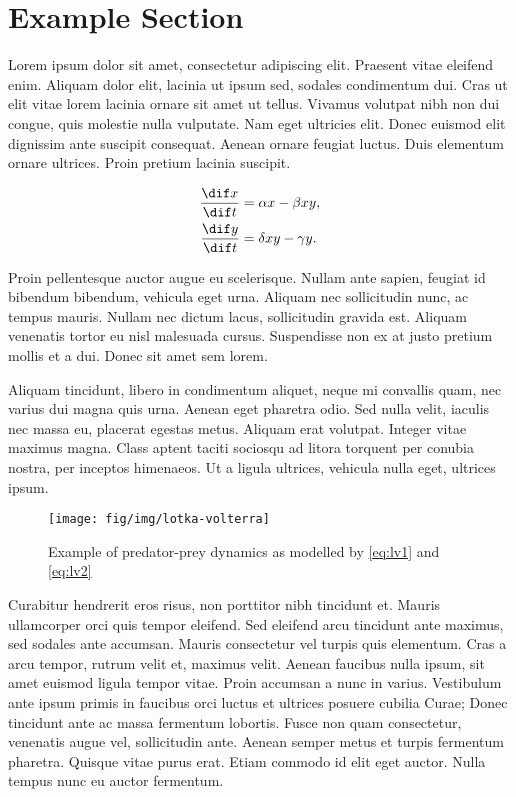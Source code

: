 \section{Example Section}
\label{sec:lvdiffeq}

Lorem ipsum dolor sit amet, consectetur adipiscing elit.
Praesent vitae eleifend enim.
Aliquam dolor elit, lacinia ut ipsum sed, sodales condimentum dui.
Cras ut elit vitae lorem lacinia ornare sit amet ut tellus.
Vivamus volutpat nibh non dui congue, quis molestie nulla vulputate.
Nam eget ultricies elit.
Donec euismod elit dignissim ante suscipit consequat.
Aenean ornare feugiat luctus.
Duis elementum ornare ultrices.
Proin pretium lacinia suscipit.

\begin{align}
  \frac{\dif x}{\dif t} &= \alpha x - \beta x y, \label{eq:lv1} \\
  \frac{\dif y}{\dif t} &= \delta xy - \gamma y .\label{eq:lv2}
\end{align}

Proin pellentesque auctor augue eu scelerisque.
Nullam ante sapien, feugiat id bibendum bibendum, vehicula eget urna.
Aliquam nec sollicitudin nunc, ac tempus mauris.
Nullam nec dictum lacus, sollicitudin gravida est.
Aliquam venenatis tortor eu nisl malesuada cursus.
Suspendisse non ex at justo pretium mollis et a dui.
Donec sit amet sem lorem.

Aliquam tincidunt, libero in condimentum aliquet, neque mi convallis quam, nec varius dui magna quis urna.
Aenean eget pharetra odio.
Sed nulla velit, iaculis nec massa eu, placerat egestas metus.
Aliquam erat volutpat.
Integer vitae maximus magna.
Class aptent taciti sociosqu ad litora torquent per conubia nostra, per inceptos himenaeos.
Ut a ligula ultrices, vehicula nulla eget, ultrices ipsum.

\begin{figure}[htbp]
  \centering
  \texttt{[image: fig/img/lotka-volterra]}
  \caption{Example of predator-prey dynamics as modelled by \eqref{eq:lv1} and \eqref{eq:lv2}}
  \label{fig:lvgraph}
\end{figure}


Curabitur hendrerit eros risus, non porttitor nibh tincidunt et.
Mauris ullamcorper orci quis tempor eleifend.
Sed eleifend arcu tincidunt ante maximus, sed sodales ante accumsan.
Mauris consectetur vel turpis quis elementum.
Cras a arcu tempor, rutrum velit et, maximus velit.
Aenean faucibus nulla ipsum, sit amet euismod ligula tempor vitae.
Proin accumsan a nunc in varius.
Vestibulum ante ipsum primis in faucibus orci luctus et ultrices posuere cubilia Curae; Donec tincidunt ante ac massa fermentum lobortis.
Fusce non quam consectetur, venenatis augue vel, sollicitudin ante.
Aenean semper metus et turpis fermentum pharetra.
Quisque vitae purus erat.
Etiam commodo id elit eget auctor.
Nulla tempus nunc eu auctor fermentum.
